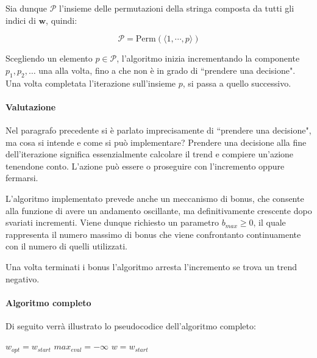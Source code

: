 Sia dunque $\mathcal{P}$ l'insieme delle permutazioni della stringa
composta da tutti gli indici di $\boldsymbol{w}$, quindi:

$$
\mathcal{P} = \text{Perm}(\langle1,\cdots, p\rangle)
$$

Scegliendo un elemento $p \in \mathcal{P}$, l'algoritmo
inizia incrementando la componente $p_1, p_2, \dots$ una alla volta, fino a che
non è in grado di ``prendere una decisione".
Una volta completata l'iterazione sull'insieme $p$, si passa a quello successivo.

\paragraph{Valutazione}
Nel paragrafo precedente si è parlato imprecisamente di
``prendere una decisione", ma cosa si intende e come si può
implementare?
Prendere una decisione alla fine dell'iterazione significa essenzialmente
calcolare il trend e compiere un'azione tenendone conto. 
L'azione può essere o proseguire con l'incremento oppure
fermarsi. 

L'algoritmo implementato prevede anche un meccanismo di bonus,
che consente alla funzione di avere un andamento
oscillante, ma definitivamente crescente dopo svariati incrementi.
Viene dunque richiesto un parametro $b_{max} \geq 0$, il quale rappresenta
il numero massimo di bonus che viene confrontanto continuamente con il
numero di quelli utilizzati.

Una volta terminati i bonus l'algoritmo arresta l'incremento se trova
un trend negativo.

\pagebreak

\paragraph{Algoritmo completo}
Di seguito verrà illustrato lo pseudocodice dell'algoritmo completo:

\begin{algorithm}[h!]
	\small
	\DontPrintSemicolon
	\BlankLine
	$w_{opt} = w_{start}$\;
	$max_{eval} = -\infty$\;
	$w = w_{start}$\;
	
	\BlankLine
	
	\caption{\textsc{}}
	\label{alg:gs}
\end{algorithm}


